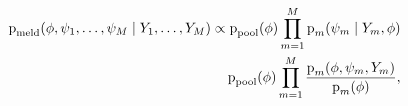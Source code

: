 \begin{align}
  \text{p}_{\text{meld}}(\phi, \psi_{1}, \ldots, \psi_{M} \mid Y_{1}, \ldots,  Y_{M}) \propto
    \text{p}_{\text{pool}}(\phi)
    \prod_{m = 1}^{M}
    \text{p}_{m}(\psi_{m} \mid Y_{m}, \phi) \\
    \text{p}_{\text{pool}}(\phi)
    \prod_{m = 1}^{M}
    \frac {
      \text{p}_{m}(\phi, \psi_{m}, Y_{m})
    } {
      \text{p}_{m}(\phi)
    },
  \label{eqn:melding-factorisation}
\end{align}